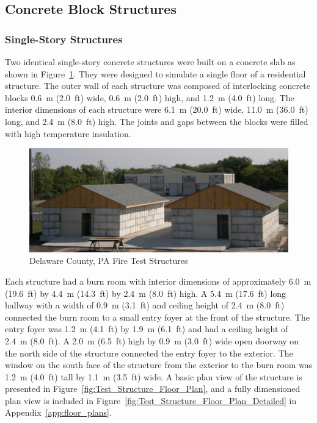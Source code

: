\documentclass[12pt,oneside]{book}
\begin{document}
\subsection{Concrete Block Structures}
\label{sec:Experimental Structures}
\subsubsection*{Single-Story Structures}

Two identical single-story concrete structures were built on a concrete slab as shown in Figure~\ref{fig:Delaware_County,_PA_Fire_Test_Structures}. They were designed to simulate a single floor of a residential structure. The outer wall of each structure was composed of interlocking concrete blocks 0.6~m (2.0~ft) wide, 0.6~m (2.0~ft) high, and 1.2~m (4.0~ft) long. The interior dimensions of each structure were 6.1~m (20.0~ft) wide, 11.0~m (36.0~ft) long, and 2.4~m (8.0~ft) high. The joints and gaps between the blocks were filled with high temperature insulation.

\begin{figure}[!ht]
	\includegraphics[width=6in]{../Figures/Pictures/DelCo_Structures}
	\caption{Delaware County, PA Fire Test Structures}
	\label{fig:Delaware_County,_PA_Fire_Test_Structures}
\end{figure}

Each structure had a burn room with interior dimensions of approximately 6.0~m (19.6~ft) by 4.4~m (14.3~ft) by 2.4~m (8.0~ft) high. A 5.4~m (17.6~ft) long hallway with a width of 0.9~m (3.1~ft) and ceiling height of 2.4~m (8.0~ft) connected the burn room to a small entry foyer at the front of the structure. The entry foyer was 1.2~m (4.1~ft) by 1.9~m (6.1~ft) and had a ceiling height of 2.4~m (8.0~ft). A 2.0~m (6.5~ft) high by 0.9~m (3.0~ft) wide open doorway on the north side of the structure connected the entry foyer to the exterior. The window on the south face of the structure from the exterior to the burn room was 1.2~m (4.0~ft) tall by 1.1~m (3.5~ft) wide. A basic plan view of the structure is presented in Figure~\ref{fig:Test_Structure_Floor_Plan}, and a fully dimensioned plan view is included in Figure~\ref{fig:Test_Structure_Floor_Plan_Detailed} in Appendix~\ref{app:floor_plans}.
\end{document}
